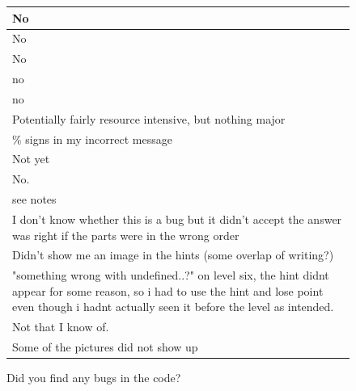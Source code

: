 \begin{figure}[H]
\begin{tabular}{|p{12cm}|} 
\hline
No \\
\hline
No \\
\hline
No \\
\hline
no \\
\hline
no \\
\hline
Potentially fairly resource intensive, but nothing major \\
\hline
\% signs in my incorrect message \\
\hline
Not yet \\
\hline
No. \\
\hline
see notes \\
\hline
I don't know whether this is a bug but it didn't accept the answer was right if the parts were in the wrong order \\
\hline
Didn't show me an image in the hints (some overlap of writing?) \\
\hline
"something wrong with undefined..?" on level six, the hint didnt appear for some reason, so i had to use the hint and lose point even though i hadnt actually seen it before the level as intended. \\
\hline
Not that I know of. \\
\hline
Some of the pictures did not show up \\
\hline
\end{tabular}
\caption{Did you find any bugs in the code?}
\end{figure}

